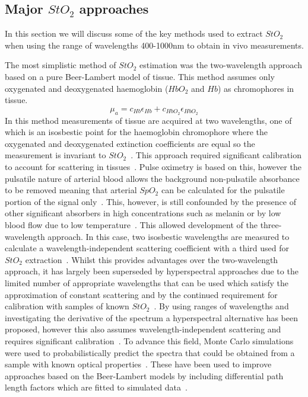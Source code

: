 \subsection{Major $StO_2$ approaches}
In this section we will discuss some of the key methods used to extract $StO_2$ when using the range of wavelengths 400-1000nm to obtain in vivo measurements. 

The most simplistic method of $StO_2$ estimation was the two-wavelength approach based on a pure Beer-Lambert model of tissue. This method assumes only oxygenated and deoxygenated haemoglobin ($HbO_2$ and $Hb$) as chromophores in tissue. 
\begin{equation}
    \mu_a = c_{Hb}\epsilon_{Hb} + c_{HbO_2}\epsilon_{HbO_2}
\end{equation}
In this method measurements of tissue are acquired at two wavelengths, one of which is an isosbestic point for the haemoglobin chromophore where the oxygenated and deoxygenated extinction coefficients are equal so the measurement is invariant to $StO_2$~\citep{MacKenzie2018}. This approach required significant calibration to account for scattering in tissues~\citep{MacKenzie2018}. Pulse oximetry is based on this, however the pulsatile nature of arterial blood allows the background non-pulsatile absorbance to be removed meaning that arterial $SpO_2$ can be calculated for the pulsatile portion of the signal only~\citep{MacKenzie2018}. This, however, is still confounded by the presence of other significant absorbers in high concentrations such as melanin or by low blood flow due to low temperature~\citep{Bangash2022, MacKenzie2018}. This allowed development of the three-wavelength approach. In this case, two isosbestic wavelengths are measured to calculate a wavelength-independent scattering coefficient with a third used for $StO_2$ extraction~\citep{MacKenzie2018}. Whilst this provides advantages over the two-wavelength approach, it has largely been superseded by hyperspectral approaches due to the limited number of appropriate wavelengths that can be used which satisfy the approximation of constant scattering and by the continued requirement for calibration with samples of known $StO_2$~\citep{MacKenzie2018}. By using ranges of wavelengths and investigating the derivative of the spectrum a hyperspectral alternative has been proposed, however this also assumes wavelength-independent scattering and requires significant calibration~\citep{Holmer2018}. To advance this field, Monte Carlo simulations were used to probabilistically predict the spectra that could be obtained from a sample with known optical properties~\citep{Wang1995}. These have been used to improve approaches based on the Beer-Lambert models by including differential path length factors which are fitted to simulated data~\citep{Clancy2020}. 

